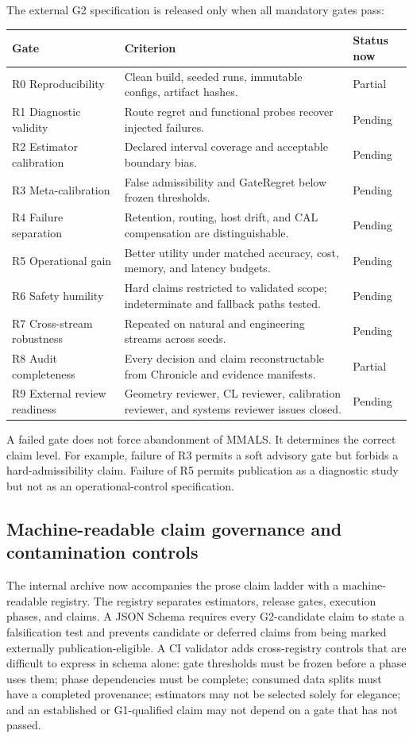\documentclass[11pt,a4paper]{article}
\begin{document}
The external G2 specification is released only when all mandatory gates pass:
\begin{longtable}{p{}p{}p{}}
\toprule Gate & Criterion & Status now \\ \midrule
R0 Reproducibility & Clean build, seeded runs, immutable configs, artifact hashes. & Partial \\
R1 Diagnostic validity & Route regret and functional probes recover injected failures. & Pending \\
R2 Estimator calibration & Declared interval coverage and acceptable boundary bias. & Pending \\
R3 Meta-calibration & False admissibility and GateRegret below frozen thresholds. & Pending \\
R4 Failure separation & Retention, routing, host drift, and CAL compensation are distinguishable. & Pending \\
R5 Operational gain & Better utility under matched accuracy, cost, memory, and latency budgets. & Pending \\
R6 Safety humility & Hard claims restricted to validated scope; indeterminate and fallback paths tested. & Pending \\
R7 Cross-stream robustness & Repeated on natural and engineering streams across seeds. & Pending \\
R8 Audit completeness & Every decision and claim reconstructable from Chronicle and evidence manifests. & Partial \\
R9 External review readiness & Geometry reviewer, CL reviewer, calibration reviewer, and systems reviewer issues closed. & Pending \\
\bottomrule
\end{longtable}

A failed gate does not force abandonment of MMALS. It determines the correct claim level. For example, failure of R3 permits a soft advisory gate but forbids a hard-admissibility claim. Failure of R5 permits publication as a diagnostic study but not as an operational-control specification.


\subsection{Machine-readable claim governance and contamination controls}
The internal archive now accompanies the prose claim ladder with a machine-readable registry. The registry separates estimators, release gates, execution phases, and claims. A JSON Schema requires every G2-candidate claim to state a falsification test and prevents candidate or deferred claims from being marked externally publication-eligible. A CI validator adds cross-registry controls that are difficult to express in schema alone: gate thresholds must be frozen before a phase uses them; phase dependencies must be complete; consumed data splits must have a completed provenance; estimators may not be selected solely for elegance; and an established or G1-qualified claim may not depend on a gate that has not passed.
\end{document}
